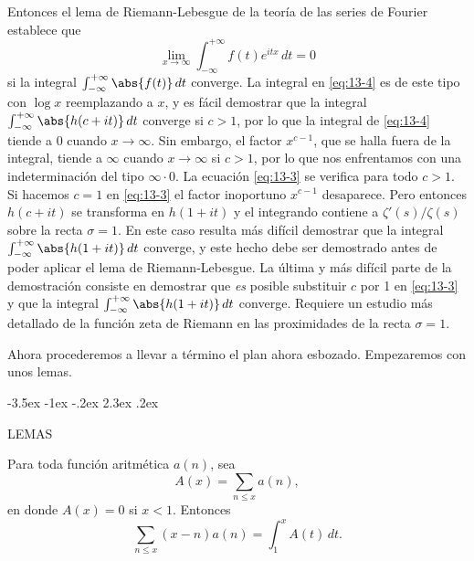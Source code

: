 \documentclass[12pt,a4paper]{book}
\makeatletter
\renewcommand\section{\@startsection{section}{1}{\z@}%
  {-3.5ex \@plus -1ex \@minus -.2ex}%
  {2.3ex \@plus .2ex}%
  {\normalfont\Large\bfseries\raggedright}}
\makeatother
\begin{document}
    Entonces el lema de Riemann-Lebesgue de la teoría de las series de Fourier establece que
    \begin{equation*}
        \lim_{x\to\infty}\int_{-\infty}^{+\infty}f(t)e^{itx}\,dt=0
    \end{equation*}
    si la integral $\int_{-\infty}^{+\infty}\abs{f(t)}\,dt$ converge. La integral en
    \eqref{eq:13-4} es de este tipo con $\log x$ reemplazando a $x$, y es fácil demostrar que
    la integral $\int_{-\infty}^{+\infty}\abs{h(c+it)}\,dt$ converge si $c>1$, por lo que la
    integral de \eqref{eq:13-4} tiende a 0 cuando $x\to\infty$. Sin embargo, el factor
    $x^{c-1}$, que se halla fuera de la integral, tiende a $\infty$ cuando $x\to\infty$ si $c>1$,
    por lo que nos enfrentamos con una indeterminación del tipo $\infty\cdot0$. La ecuación
    \eqref{eq:13-3} se verifica para todo $c>1$. Si hacemos $c=1$ en \eqref{eq:13-3} el
    factor inoportuno $x^{c-1}$ desaparece. Pero entonces $h(c+it)$ se transforma en
    $h(1+it)$ y el integrando contiene a $\zeta'(s)/\zeta(s)$ sobre la recta $\sigma=1$. En
    este caso resulta más difícil demostrar que la integral
    $\int_{-\infty}^{+\infty}\abs{h(1+it)}\,dt$ converge, y este hecho debe ser demostrado
    antes de poder aplicar el lema de Riemann-Lebesgue. La última y más difícil parte de la
    demostración consiste en demostrar que \textit{es} posible substituir $c$ por 1 en
    \eqref{eq:13-3} y que la integral $\int_{-\infty}^{+\infty}\abs{h(1+it)}\,dt$ converge.
    Requiere un estudio más detallado de la función zeta de Riemann en las proximidades de la
    recta $\sigma=1$.

    Ahora procederemos a llevar a término el plan ahora esbozado. Empezaremos con unos lemas.

    \section{LEMAS}

    \begin{lema}\label{lem:13-1}
        Para toda función aritmética $a(n)$, sea
        \begin{equation*}
            A(x)=\sum_{n\leq x}a(n),
        \end{equation*}
        en donde $A(x)=0$ si $x<1$. Entonces
        \begin{equation}\label{eq:13-5}
            \sum_{n\leq x}(x-n)a(n)=\int_{1}^{x}A(t)\,dt.
        \end{equation}
    \end{lema}
\end{document}
